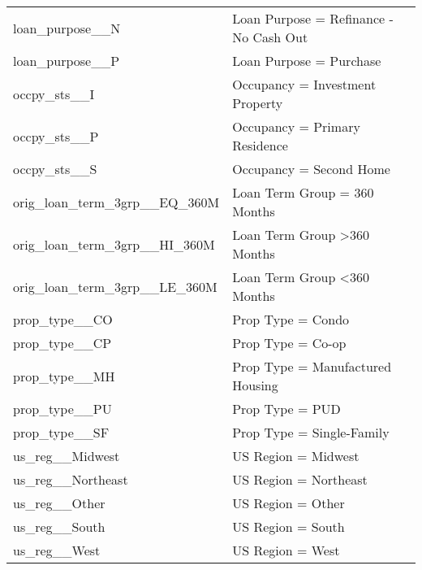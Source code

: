 \begin{longtable}{lp{8cm}}
loan\_purpose\_\_N                 & Loan Purpose = Refinance - No Cash Out                               \\
loan\_purpose\_\_P                 & Loan Purpose = Purchase                                              \\\hline
occpy\_sts\_\_I                    & Occupancy = Investment Property                                      \\
occpy\_sts\_\_P                    & Occupancy = Primary Residence                                        \\
occpy\_sts\_\_S                    & Occupancy = Second Home                                              \\\hline
orig\_loan\_term\_3grp\_\_EQ\_360M & Loan Term Group = 360 Months                                         \\
orig\_loan\_term\_3grp\_\_HI\_360M & Loan Term Group \textgreater 360 Months                              \\
orig\_loan\_term\_3grp\_\_LE\_360M & Loan Term Group \textless 360 Months                                 \\\hline
prop\_type\_\_CO                   & Prop Type = Condo                                                    \\
prop\_type\_\_CP                   & Prop Type = Co-op                                                    \\
prop\_type\_\_MH                   & Prop Type = Manufactured Housing                                     \\
prop\_type\_\_PU                   & Prop Type = PUD                                                      \\
prop\_type\_\_SF                   & Prop Type = Single-Family                                            \\\hline
us\_reg\_\_Midwest                 & US Region = Midwest                                                  \\
us\_reg\_\_Northeast               & US Region = Northeast                                                \\
us\_reg\_\_Other                   & US Region = Other                                                    \\
us\_reg\_\_South                   & US Region = South                                                    \\
us\_reg\_\_West                    & US Region = West                                                     \\\hline

\end{longtable}
